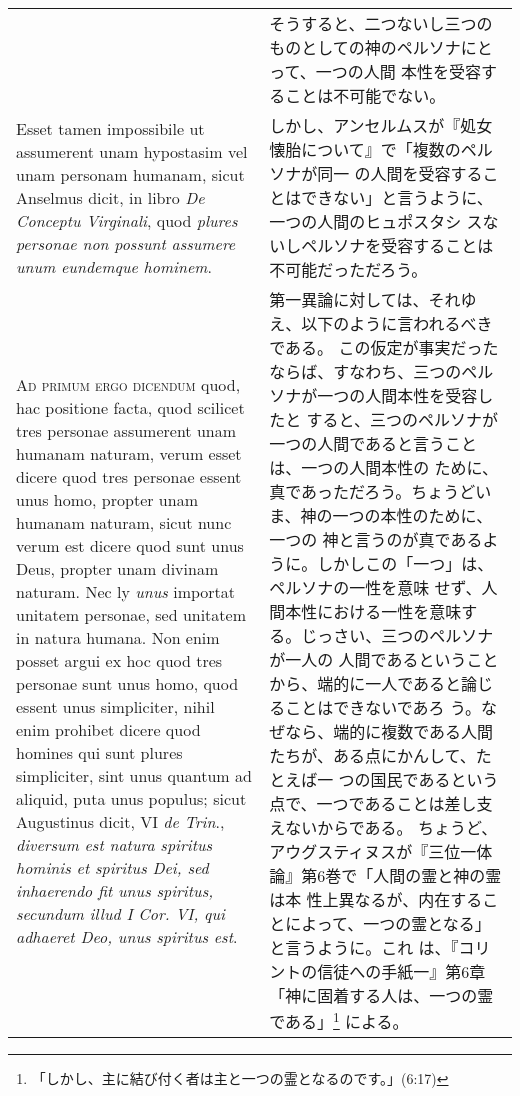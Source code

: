 \documentclass[10pt]{jsarticle} %
\begin{document}
\begin{longtable}{p{21em}p{21em}}
&

そうすると、二つないし三つのものとしての神のペルソナにとって、一つの人間
 本性を受容することは不可能でない。

\\


Esset tamen impossibile ut assumerent unam hypostasim vel unam
personam humanam, sicut Anselmus dicit, in libro {\itshape De Conceptu Virginali},
quod {\itshape plures personae non possunt assumere unum eundemque hominem}.


&

しかし、アンセルムスが『処女懐胎について』で「複数のペルソナが同一
 の人間を受容することはできない」と言うように、一つの人間のヒュポスタシ
 スないしペルソナを受容することは不可能だっただろう。


\\



{\scshape Ad primum ergo dicendum} quod, hac positione facta, quod scilicet tres
personae assumerent unam humanam naturam, verum esset dicere quod tres
personae essent unus homo, propter unam humanam naturam, sicut nunc
verum est dicere quod sunt unus Deus, propter unam divinam naturam. Nec
ly {\itshape unus} importat unitatem personae, sed unitatem in natura humana. Non
enim posset argui ex hoc quod tres personae sunt unus homo, quod essent
unus simpliciter, nihil enim prohibet dicere quod homines qui sunt
plures simpliciter, sint unus quantum ad aliquid, puta unus populus;
sicut Augustinus dicit, VI {\itshape de Trin}., {\itshape diversum est natura spiritus
hominis et spiritus Dei, sed inhaerendo fit unus spiritus, secundum
illud I Cor. VI, qui adhaeret Deo, unus spiritus est}.


&


第一異論に対しては、それゆえ、以下のように言われるべきである。
この仮定が事実だったならば、すなわち、三つのペルソナが一つの人間本性を受容したと
 すると、三つのペルソナが一つの人間であると言うことは、一つの人間本性の
 ために、真であっただろう。ちょうどいま、神の一つの本性のために、一つの
 神と言うのが真であるように。しかしこの「一つ」は、ペルソナの一性を意味
 せず、人間本性における一性を意味する。じっさい、三つのペルソナが一人の
 人間であるということから、端的に一人であると論じることはできないであろ
 う。なぜなら、端的に複数である人間たちが、ある点にかんして、たとえば一
 つの国民であるという点で、一つであることは差し支えないからである。
ちょうど、アウグスティヌスが『三位一体論』第6巻で「人間の霊と神の霊は本
 性上異なるが、内在することによって、一つの霊となる」と言うように。これ
 は、『コリントの信徒への手紙一』第6章「神に固着する人は、一つの霊である」\footnote{「しかし、主に結び付く者は主と一つの霊となるのです。」(6:17)} による。




\end{longtable}
\end{document}

